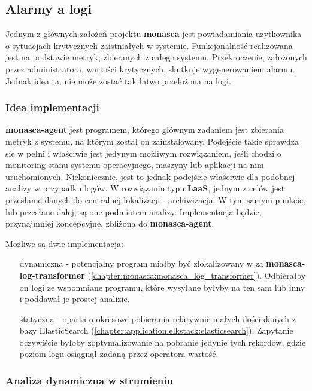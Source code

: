 \subsection{Alarmy a logi}
\label{chapter:application:plans:alarm_on_logs}

Jednym z głównych założeń projektu \textbf{monasca} jest powiadamiania użytkownika o 
sytuacjach krytycznych zaistniałych w systemie. Funkcjonalność realizowana jest na podstawie
metryk, zbieranych z całego systemu. Przekroczenie, założonych przez administratora, wartości
krytycznych, skutkuje wygenerowaniem alarmu. Jednak idea ta, nie może zostać
tak łatwo przełożona na logi. 

    \subsubsection{Idea implementacji}
    \textbf{monasca-agent} jest programem, którego głównym zadaniem jest zbierania metryk z systemu, na którym
    został on zainstalowany. Podejście takie sprawdza się w pełni i właściwie jest jedynym możliwym rozwiązaniem,
    jeśli chodzi o monitoring stanu systemu operacyjnego, maszyny lub aplikacji na nim uruchomionych. Niekoniecznie,
    jest to jednak podejście właściwie dla podobnej analizy w przypadku logów. W rozwiązaniu typu \textbf{LaaS}, 
    jednym z celów jest przesłanie danych do centralnej lokalizacji - archiwizacja. W tym samym punkcie, lub
    przesłane dalej, są one podmiotem analizy. Implementacja będzie, przynajmniej koncepcyjne, zbliżona do \textbf{monasca-agent}.
    
    Możliwe są dwie implementacja:
    \begin{itemize}
        \item[dynamiczna] - potencjalny program miałby być zlokalizowany w za \textbf{monasca-log-transformer} (\ref{chapter:monasca:monasca_log_transformer}).
        Odbierałby on logi ze wspomniane programu, które wysyłane byłyby na ten sam lub inny  i poddawał je prostej analizie. 
        \item[statyczna] - oparta o okresowe pobierania relatywnie małych ilości danych z bazy ElasticSearch (\ref{chapter:application:elkstack:elasticsearch}). 
        Zapytanie oczywiście byłoby zoptymalizowanie na pobranie jedynie tych rekordów, gdzie poziom logu osiągnął zadaną przez operatora wartość.
    \end{itemize}
    
    \subsubsection{Analiza dynamiczna w strumieniu}
    \label{chapter:application:plans:alarm_on_logs:streaming}
    
